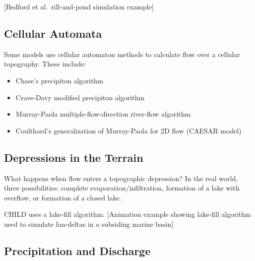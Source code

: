 \documentclass[12pt]{amsart}
\begin{document}
[Bedford et al.\ rill-and-pond simulation example]

\subsection{Cellular Automata}

Some models use cellular automaton methods to calculate flow over a cellular topography. These include:
\begin{itemize}
\item Chase's precipiton algorithm
\item Crave-Davy modified precipiton algorithm
\item Murray-Paola multiple-flow-direction river-flow algorithm
\item Coulthard's generalization of Murray-Paola for 2D flow (CAESAR model)
\end{itemize}

\subsection{Depressions in the Terrain}

What happens when flow enters a topographic depression? In the real world, three possibilities: complete evaporation/infiltration, formation of a lake with overflow, or formation of a closed lake. 

CHILD uses a lake-fill algorithm. [Animation example showing lake-fill algorithm used to simulate fan-deltas in a subsiding marine basin]


\subsection{Precipitation and Discharge}
\end{document}
